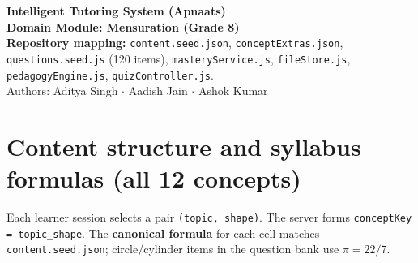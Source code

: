\documentclass[12pt,a4paper]{article}
\begin{document}
\begin{center}
{\large\bfseries\color{primaryblue}Intelligent Tutoring System (Apnaats)}\\[0.2em]
{\normalsize\bfseries Domain Module: Mensuration (Grade 8)}\\[0.35em]
{\small\textbf{Repository mapping:} \texttt{content.seed.json}, \texttt{conceptExtras.json},
\texttt{questions.seed.js} (120 items), \texttt{masteryService.js}, \texttt{fileStore.js},
\texttt{pedagogyEngine.js}, \texttt{quizController.js}.}\\[0.25em]
{\small Authors: Aditya Singh $\cdot$ Aadish Jain $\cdot$ Ashok Kumar}
\end{center}

\section{Content structure and syllabus formulas (all 12 concepts)}

Each learner session selects a pair \texttt{(topic, shape)}. The server forms
\texttt{conceptKey = topic\_shape}. The \textbf{canonical formula} for each cell matches
\texttt{content.seed.json}; circle/cylinder items in the question bank use \textbf{$\pi = 22/7$}.
\end{document}
